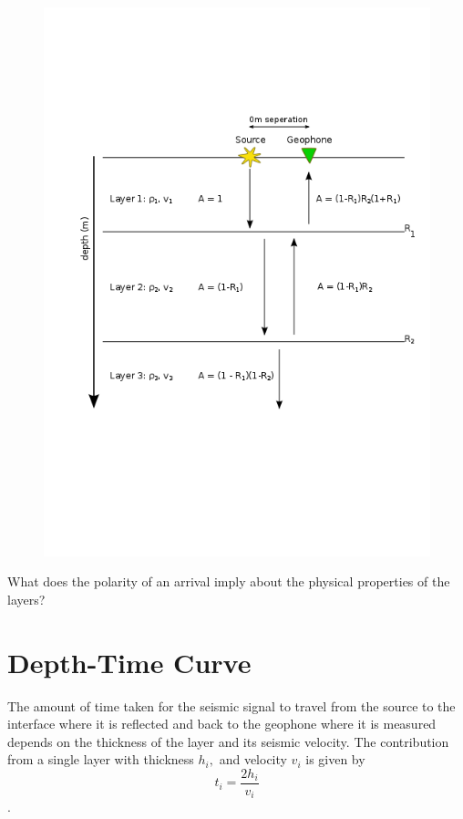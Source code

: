 \documentclass{article}[11pt,oneside]
\begin{document}
\begin{figure}[H]
	\centering \includegraphics[width=\textwidth]{Amplitude.png}
\end{figure}

What does the polarity of an arrival imply about the physical properties of the layers?



\section*{Depth-Time Curve}
The amount of time taken for the seismic signal to travel from the source to the interface where it is reflected and back to the geophone where it is measured depends on the thickness of the layer and its seismic velocity. The contribution from a single layer with thickness $h_i,$ and velocity $v_i$ is given by
$$t_i = \frac{2h_i}{v_i}$$.
\end{document}
